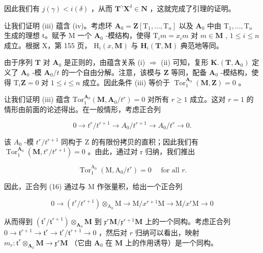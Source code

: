 因此我们有 \(j(\gamma) < i(\delta)\) ，从而 \(\mathbf{T}^{\gamma}\mathbf{X}^{\delta} \in \mathbf{N}\) ，这就完成了引理的证明。

让我们证明 (iii) 蕴含 (iv)。考虑环 \(\mathbf{A}_0 = \mathbf{Z}[\mathrm{T}_1, \ldots, \mathrm{T}_n]\) 以及 \(\mathbf{A}_0\) 中由 \(\mathrm{T}_1, \ldots, \mathrm{T}_n\) 生成的理想 t。赋予 M 一个 \(\mathbf{A}_0\) -模结构，使得 \(\mathrm{T}_i m = x_i m\) 对 \(m \in \mathbf{M}\) , \(1 \leqslant i \leqslant n\) 成立。根据 X，第 155 页， \(\mathrm{H}_i(x, \mathbf{M})\) 与 \(\mathbf{H}_i(\mathbf{T}, \mathbf{M})\) 典范地等同。

由于序列 \(\mathbf{T}\) 对 \(\mathbf{A}_{0}\) 是正则的，由蕴含关系 (i) \(\Rightarrow\) (ii) 可知，复形 \(\mathbf{K}.\left(\mathbf{T},\mathbf{A}_{0}\right)\) 定义了 \(\mathbf{A}_{0}\) -模 \(\mathbf{A}_{0}/t\) 的一个自由分解。注意，该模与 \(\mathbf{Z}\) 等同，配备 \(\mathbf{A}_{0}\) -模结构，使得 \(\mathrm{T}_{i}\mathbf{Z}=0\) 对 \(1\leqslant i\leqslant n\) 成立。因此条件 (iii) 等价于 \(\operatorname{Tor}_{1}^{\mathbf{A}_{0}}(\mathbf{M},\mathbf{Z})=0\) 。

让我们证明 (iii) 蕴含 \(\mathrm{Tor}_{1}^{\mathbf{A}_{0}}(\mathbf{M},\mathbf{A}_{0}/t^{r})=0\) 对所有 \(r\geqslant1\) 成立。这对 \(r=1\) 的情形由前面的论述得出。在一般情形，考虑正合列

\[
0 \rightarrow t ^ {r} / t ^ {r + 1} \rightarrow A _ {0} / t ^ {r + 1} \rightarrow A _ {0} / t ^ {r} \rightarrow 0.\tag{16}
\]

该 \(A_{0}\) -模 \(t^{r}/t^{r+1}\) 同构于 Z 的有限份拷贝的直积；因此我们有 \(\operatorname{Tor}_{1}^{\mathbf{A}_{0}}(\mathbf{M}, t^{r}/t^{r+1}) = 0\) 。由此，通过对 r 归纳，我们推出

\[
\operatorname{Tor} _ {1} ^ {\mathrm{A} _ {0}} \left(\mathrm{M}, \mathrm{A} _ {0} / t ^ {r}\right) = 0 \quad \text { for   all } r.
\]

因此，正合列 (16) 通过与 M 作张量积，给出一个正合列

\[
0 \rightarrow (t ^ {r} / t ^ {r + 1}) \otimes_ {\mathrm{A} _ {0}} \mathrm{M} \rightarrow \mathrm{M} / x ^ {r + 1} \mathrm{M} \rightarrow \mathrm{M} / x ^ {r} \mathrm{M} \rightarrow 0\tag{17}
\]

从而得到 \((\mathfrak{t}^r /\mathfrak{t}^{r + 1})\otimes_{\mathbf{A}_0}\mathbf{M}\) 到 \(\mathfrak{x}^r\mathbf{M} / \mathfrak{x}^{r + 1}\mathbf{M}\) 上的一个同构。考虑正合列 \(0\to \mathfrak{t}^{r + 1}\to \mathfrak{t}^r\to \mathfrak{t}^r /\mathfrak{t}^{r + 1}\to 0\) ，然后对 \(r\) 归纳可以看出，映射 \(m_r:\mathfrak{t}^r\otimes_{\mathbf{A}_0}\mathbf{M}\rightarrow \mathfrak{x}^r\mathbf{M}\) （它由 \(\mathbf{A}_0\) 在 \(\mathbf{M}\) 上的作用诱导）是一个同构。

